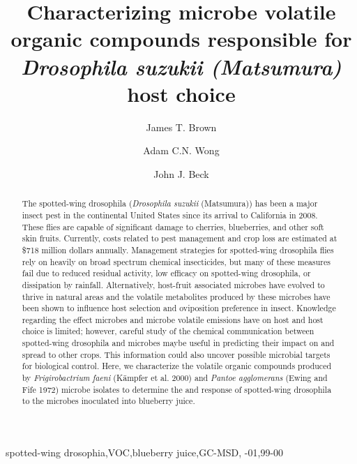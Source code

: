 \documentclass[review]{elsarticle}
\begin{document}
\begin{frontmatter}

\title{Characterizing microbe volatile organic compounds responsible for \textit{Drosophila suzukii (Matsumura)} host choice}


\author[usda]{James T. Brown}

\author[uf]{Adam C.N. Wong}
\author[usda]{John J. Beck}

\address[usda]{USDA‐ARS Center for Medical, Agricultural, and Veterinary Entomology, 1700 SW 23rd Drive, Gainesville, FL 32608, USA}

\address[uf]{Department of Entomology and Nematology, University of Florida, Gainesville, FL 32611}



\begin{abstract}
The spotted-wing drosophila (\textit{Drosophila suzukii} (Matsumura)) has been a major insect pest in the continental United States since its arrival to California in 2008. These flies are capable of significant damage to cherries, blueberries, and other soft skin fruits. Currently, costs related to pest management and crop loss are estimated at \$718 million dollars annually. Management strategies for spotted-wing drosophila flies rely on heavily on broad spectrum chemical insecticides, but many of these measures fail due to reduced residual activity, low efficacy on spotted-wing drosophila, or dissipation by rainfall. Alternatively, host-fruit associated microbes have evolved to thrive in natural areas and the volatile metabolites produced by these microbes have been shown to influence host selection and oviposition preference in insect. Knowledge regarding the effect microbes and microbe volatile emissions have on host and host choice is limited; however, careful study of the chemical communication between spotted-wing drosophila and microbes maybe useful in predicting their impact on and spread to other crops. This information could also uncover possible microbial targets for biological control. Here, we characterize the volatile organic compounds produced by \textit{Frigirobactrium faeni} (K\"{a}mpfer et al. 2000) and \textit{Pantoe agglomerans} (Ewing and Fife 1972) microbe isolates to determine the  and response of spotted-wing drosophila to the microbes inoculated into blueberry juice.
\end{abstract}

\begin{keyword}
\textttInsect spotted-wing drosophia\sep VOC\sep blueberry juice\sep GC-MSD\sep 
{}-01\sep  99-00
\end{keyword}

\end{frontmatter}
\end{document}
